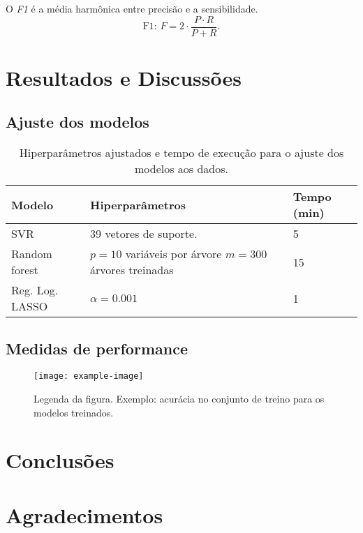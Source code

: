 \documentclass[9pt, a4paper, twocolumn]{article}
\begin{document}
O \emph{F1} é a média harmônica entre precisão e a sensibilidade.
$$
\text{F1: } F = 2\cdot\frac{P\cdot R}{P + R}.
$$


\section{Resultados e Discussões}

\lipsum[13]

\subsection{Ajuste dos modelos}

\lipsum[14]

\begin{table}[H]
  \caption{Hiperparâmetros ajustados e tempo de execução para o ajuste dos modelos aos dados.}
  \begin{tabular}{p{1.5cm} p{4.5cm} p{3em}}
    \hline
    Modelo & Hiperparâmetros & Tempo (min) \\ \hline
    SVR & 39 vetores de suporte. & 5 \\[1ex]
    Random forest & {$p = 10$ variáveis por árvore\newline
                    $m = 300$ árvores treinadas} & 15\\[4ex]
    Reg. Log. LASSO & {$\alpha = 0.001$} & 1\\ \hline
  \end{tabular}
\end{table}

\subsection{Medidas de performance}

\lipsum[15]

\begin{figure}[H]
  \centering
  \texttt{[image: example-image]}
  \caption{Legenda da figura. Exemplo: acurácia no conjunto de treino para os modelos treinados.}
  \label{fig_01}
\end{figure}


\section{Conclusões}\label{Conclusao}

\lipsum[16]

\section*{Agradecimentos}

\lipsum[17]


%
%
\end{document}
